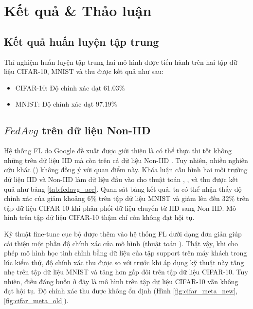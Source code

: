 \chapter{Kết quả \& Thảo luận}
\label{Chapter5}

\section{Kết quả huấn luyện tập trung}

Thí nghiệm huấn luyện tập trung hai mô hình được tiến hành trên hai tập dữ liệu CIFAR-10, MNIST và thu được kết quả như sau:

\begin{itemize}
    \item CIFAR-10: Độ chính xác đạt 61.03\%
    \item MNIST: Độ chính xác đạt 97.19\%
\end{itemize}

\section{$FedAvg$ trên dữ liệu Non-IID}

Hệ thống FL do Google đề xuất được giới thiệu là có thể thực thi tốt không những trên dữ liệu IID mà còn trên cả dữ liệu Non-IID \cite{mcmahan2017communication}. Tuy nhiên, nhiều nghiên cứu khác (\parencite{chen2018federated, zhao2018federated, zhu2021federated, wang2019federated}) không đồng ý với quan điểm này. Khóa luận cấu hình hai môi trường dữ liệu IID và Non-IID làm dữ liệu đầu vào cho thuật toán , ,  và thu được kết quả như bảng \ref{tab:fedavg_acc}. Quan sát bảng kết quả, ta có thể nhận thấy độ chính xác của  giảm khoảng 6\% trên tập dữ liệu MNIST và giảm lên đến 32\% trên tập dữ liệu CIFAR-10 khi phân phối dữ liệu chuyển từ IID sang Non-IID. Mô hình trên tập dữ liệu CIFAR-10 thậm chí còn không đạt hội tụ.

Kỹ thuật fine-tune cục bộ được thêm vào hệ thống FL dưới dạng đơn giản giúp cải thiện một phần độ chính xác của mô hình (thuật toán ). Thật vậy, khi cho phép mô hình học tinh chỉnh bằng dữ liệu của tập support trên máy khách trong lúc kiểm thử, độ chính xác thu được so với trước khi áp dụng kỹ thuật này tăng nhẹ trên tập dữ liệu MNIST và tăng hơn gấp đôi trên tập dữ liệu CIFAR-10. Tuy nhiên, điều đáng buồn ở đây là mô hình trên tập dữ liệu CIFAR-10 vẫn không đạt hội tụ. Độ chính xác thu được không ổn định (Hình \ref{fig:cifar_meta_new}, \ref{fig:cifar_meta_old}).

